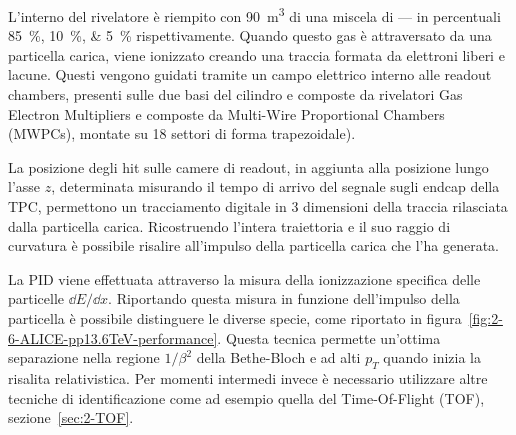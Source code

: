     L’interno del rivelatore è riempito con \qty{90}{\meter^3} di una miscela di ---- in percentuali \qtylist{85;10;5}{\percent} rispettivamente. Quando questo gas è attraversato da una particella carica, viene ionizzato creando una traccia formata da elettroni liberi e lacune. Questi vengono guidati tramite un campo elettrico interno alle readout chambers, presenti sulle due basi del cilindro e composte da rivelatori Gas Electron Multipliers e composte da Multi-Wire Proportional Chambers (MWPCs), montate su 18 settori di forma trapezoidale).

    
    La posizione degli hit sulle camere di readout, in aggiunta alla posizione lungo l’asse $z$, determinata misurando il tempo di arrivo del segnale sugli endcap della TPC, permettono un tracciamento digitale in 3 dimensioni della traccia rilasciata dalla particella carica. Ricostruendo l’intera traiettoria e il suo raggio di curvatura è possibile risalire all’impulso della particella carica che l’ha generata.
    
    La PID viene effettuata attraverso la misura della ionizzazione specifica delle particelle $\dd{E}/\dd{x}$. Riportando questa misura in funzione dell’impulso della particella è possibile distinguere le diverse specie, come riportato in figura~\ref{fig:2-6-ALICE-pp13.6TeV-performance}. Questa tecnica permette un'ottima separazione nella regione $1/\beta^2$ della Bethe-Bloch e ad alti $p_{T}$ quando inizia la risalita relativistica. Per momenti intermedi invece è necessario utilizzare altre tecniche di identificazione come ad esempio quella del Time-Of-Flight (TOF), sezione~\ref{sec:2-TOF}.


